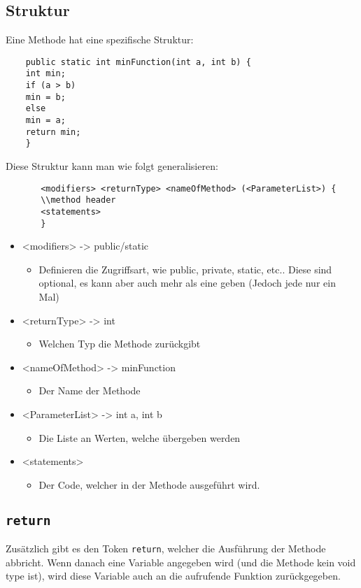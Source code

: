 \documentclass{article}
\begin{document}
	\subsection{Struktur}
	Eine Methode hat eine spezifische Struktur:
	\begin{verbatim}
	public static int minFunction(int a, int b) {
	int min;
	if (a > b)
	min = b;
	else
	min = a;
	return min;
	}
	\end{verbatim}
	Diese Struktur kann man wie folgt generalisieren:
	\begin{verbatim}
	   <modifiers> <returnType> <nameOfMethod> (<ParameterList>) { 
	   \\method header
	   <statements>
	   }
	\end{verbatim}  
	\begin{itemize}
		\item{<modifiers> -> public/static}
		\begin{itemize}
			\item{Definieren die Zugriffsart, wie public, private, static, etc.. Diese sind optional, es kann aber auch mehr als eine geben (Jedoch jede nur ein Mal)}
		\end{itemize}
		\item{<returnType> -> int}
		\begin{itemize}
			\item{Welchen Typ die Methode zurückgibt}
		\end{itemize}
		\item{<nameOfMethod> -> minFunction}
		\begin{itemize}
			\item{Der Name der Methode}
		\end{itemize}
		\item{<ParameterList> -> int a, int b}
		\begin{itemize}
			\item{Die Liste an Werten, welche übergeben werden}
		\end{itemize}
		\item{<statements>}
		\begin{itemize}
			\item{Der Code, welcher in der Methode ausgeführt wird.}
		\end{itemize}
	\end{itemize}
	\subsection{\texorpdfstring{\texttt{return}}{return}}
	Zusätzlich gibt es den Token \verb|return|, welcher die Ausführung der Methode abbricht. Wenn danach eine Variable angegeben wird (und die Methode kein void type ist), wird diese Variable auch an die aufrufende Funktion zurückgegeben.
\end{document}
